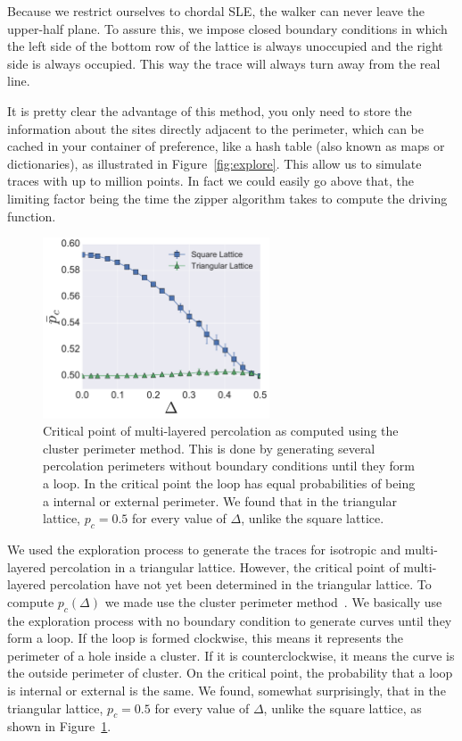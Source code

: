 Because we restrict ourselves to chordal SLE, the walker can never leave the
upper-half plane. To assure this, we impose closed boundary conditions in which
the left side of the bottom row of the lattice is always unoccupied and the
right side is always occupied. This way the trace will always turn away from
the real line.

It is pretty clear the advantage of this method, you only need to store the
information about the sites directly adjacent to the perimeter, which can be
cached in your container of preference, like a hash table (also known as maps
or dictionaries), as illustrated in Figure~\ref{fig:explore}. This allow us to
simulate traces with up to million points. In fact we could easily go above
that, the limiting factor being the time the zipper algorithm takes to compute
the driving function.

\begin{figure}[t]
\begin{center}
    \includegraphics[width=0.6\textwidth]{chapters/ch6-asle/figs/mlp_ps}
\end{center}
\caption{Critical point of multi-layered percolation as computed using the
    cluster perimeter method. This is done by generating several percolation
    perimeters without boundary conditions until they form a loop. In the
    critical point the loop has equal probabilities of being a internal or
    external perimeter. We found that in the triangular lattice, $p_c=0.5$
    for every value of $\Delta$, unlike the square lattice.}
\label{fig:mlp_ps}
\end{figure}

We used the exploration process to generate the traces for isotropic and
multi-layered percolation in a triangular lattice. However, the critical point
of multi-layered percolation have not yet been determined in the triangular
lattice. To compute $p_c(\Delta)$ we made use the cluster perimeter
method~\cite{Ziff1986}. We basically use the exploration process with no
boundary condition to generate curves until they form a loop. If the loop is
formed clockwise, this means it represents the perimeter of a hole inside a
cluster. If it is counterclockwise, it means the curve is the outside perimeter
of cluster. On the critical point, the probability that a loop is internal or
external is the same. We found, somewhat surprisingly, that in the triangular
lattice, $p_c=0.5$ for every value of $\Delta$, unlike the square lattice, as
shown in Figure~\ref{fig:mlp_ps}.

